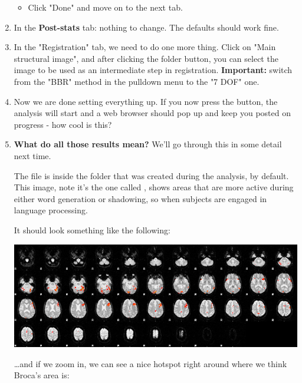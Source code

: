\begin{enumerate}
\begin{itemize}
    \item Click "Done" and move on to the next tab.
    
      
    \end{itemize}

  \item In the \textbf{Post-stats} tab: nothing to change. The defaults should work fine.
    
    \item In the "Registration" tab, we need to do one more thing. Click on "Main structural image", and after clicking the folder button, you can select the  image to be used as an intermediate step in registration. \textbf{Important:} switch from the "BBR" method in the pulldown menu to the "7 DOF" one.
    
    \item Now we are done setting everything up. If you now press the  button, the analysis will start and a web browser should pop up and keep you posted on progress - how cool is this?
    
    \item \textbf{What do all those results mean?} We'll go through this in some detail next time. 
        
    The file \textcolor{red}{} is inside the folder that was created during the analysis,  by default. This image, note it's the one called \underline{}, shows areas that are more active during either word generation or shadowing, so when subjects are engaged in language processing.
    
    It should look something like the following:
    
         \begin{center}
    \includegraphics[width=13cm]{rendered_thresh_zfstat1.png}
	\end{center}
	
	\dots and if we zoom in, we can see a nice hotspot right around where we think Broca's area is:
	

\end{enumerate}
